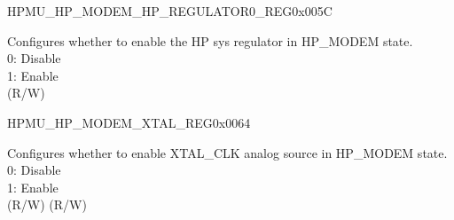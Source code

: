 \begin{register}{H}{PMU\_HP\_MODEM\_HP\_REGULATOR0\_REG}{0x005C}\label{regdesc:PMUHPMODEMHPREGULATOR0REG}
%
%
%
%
\regnewline%
\begin{regdesc}\begin{reglist}
\label{fielddesc:PMUHPMODEMHPREGULATORXPD}\item [PMU\_HP\_MODEM\_HP\_REGULATOR\_XPD] Configures whether to enable the HP sys regulator in HP\_MODEM state.\\
0: Disable\\
1: Enable\\
(R/W)
\end{reglist}\end{regdesc}
\end{register}


\begin{register}{H}{PMU\_HP\_MODEM\_XTAL\_REG}{0x0064}\label{regdesc:PMUHPMODEMXTALREG}
%
%
\regnewline%
\begin{regdesc}\begin{reglist}
\label{fielddesc:PMUHPMODEMXPDXTAL}\item [PMU\_HP\_MODEM\_XPD\_XTAL] Configures whether to enable XTAL\_CLK analog source in HP\_MODEM state.\\
0: Disable\\
1: Enable\\
(R/W)
(R/W)
\end{reglist}\end{regdesc}
\end{register}


